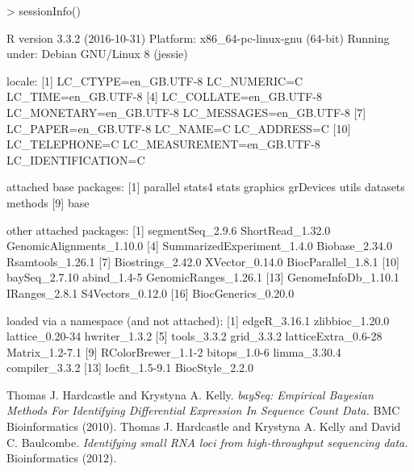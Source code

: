 \documentclass[a4paper]{article}
\begin{document}
\begin{Schunk}
\begin{Sinput}
> sessionInfo()
\end{Sinput}
\begin{Soutput}
R version 3.3.2 (2016-10-31)
Platform: x86_64-pc-linux-gnu (64-bit)
Running under: Debian GNU/Linux 8 (jessie)

locale:
 [1] LC_CTYPE=en_GB.UTF-8       LC_NUMERIC=C               LC_TIME=en_GB.UTF-8       
 [4] LC_COLLATE=en_GB.UTF-8     LC_MONETARY=en_GB.UTF-8    LC_MESSAGES=en_GB.UTF-8   
 [7] LC_PAPER=en_GB.UTF-8       LC_NAME=C                  LC_ADDRESS=C              
[10] LC_TELEPHONE=C             LC_MEASUREMENT=en_GB.UTF-8 LC_IDENTIFICATION=C       

attached base packages:
[1] parallel  stats4    stats     graphics  grDevices utils     datasets  methods  
[9] base     

other attached packages:
 [1] segmentSeq_2.9.6           ShortRead_1.32.0           GenomicAlignments_1.10.0  
 [4] SummarizedExperiment_1.4.0 Biobase_2.34.0             Rsamtools_1.26.1          
 [7] Biostrings_2.42.0          XVector_0.14.0             BiocParallel_1.8.1        
[10] baySeq_2.7.10              abind_1.4-5                GenomicRanges_1.26.1      
[13] GenomeInfoDb_1.10.1        IRanges_2.8.1              S4Vectors_0.12.0          
[16] BiocGenerics_0.20.0       

loaded via a namespace (and not attached):
 [1] edgeR_3.16.1        zlibbioc_1.20.0     lattice_0.20-34     hwriter_1.3.2      
 [5] tools_3.3.2         grid_3.3.2          latticeExtra_0.6-28 Matrix_1.2-7.1     
 [9] RColorBrewer_1.1-2  bitops_1.0-6        limma_3.30.4        compiler_3.3.2     
[13] locfit_1.5-9.1      BiocStyle_2.2.0    
\end{Soutput}
\end{Schunk}

\begin{thebibliography}{99}
 Thomas J. Hardcastle and Krystyna A. Kelly. \textsl{baySeq: Empirical Bayesian Methods For Identifying Differential Expression In Sequence Count Data.} BMC Bioinformatics (2010).
 Thomas J. Hardcastle and Krystyna A. Kelly and David C. Baulcombe. \textsl{Identifying small RNA loci from high-throughput sequencing data.} Bioinformatics (2012).

\end{thebibliography}
\end{document}
